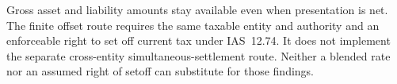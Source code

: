 Gross asset and liability amounts stay available even when presentation is
net. The finite offset route requires the same taxable entity and authority
and an enforceable right to set off current tax under IAS~12.74. It does not
implement the separate cross-entity simultaneous-settlement route. Neither a
blended rate nor an assumed right of setoff can substitute for those findings.
